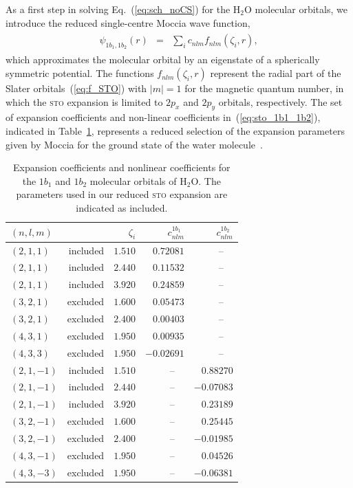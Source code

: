 As a first step in solving Eq.~(\ref{eq:sch_noCS}) for the H$_{2}$O
molecular orbitals, we introduce the reduced single-centre Moccia
wave function,
%
\begin{eqnarray}
  \begin{split}
    \psi_{1b_{1},1b_{2}}(r) & = & \sum\limits_{i} c_{nlm} f_{nlm}(\zeta_{i}, r),
    \label{eq:sto_1b1_1b2}
  \end{split}
\end{eqnarray}
%
which approximates the molecular orbital by an eigenstate of a
spherically symmetric potential. The functions $f_{nlm}(\zeta_{i},r)$
represent the radial part of the Slater orbitals~(\ref{eq:f_STO}) with
$|m|=1$ for the magnetic quantum number, in which the \textsc{sto}
expansion is limited to $2p_{x}$ and $2p_{y}$ orbitals,
respectively. The set of expansion coefficients and non-linear
coefficients in~(\ref{eq:sto_1b1_1b2}), indicated in
Table~\ref{tab:1b11b2_coef}, represents a reduced selection of the
expansion parameters given by Moccia for the ground state of the water
molecule~\cite{Moccia_1964}.

\begin{table}[t]
 \centering
  \caption{\label{tab:1b11b2_coef} Expansion coefficients and
    nonlinear coefficients for the $1b_{1}$ and $1b_{2}$ molecular
    orbitals of H$_{2}$O. The parameters used in our reduced
    \textsc{sto} expansion are indicated as included.}
  \begin{tabular}{lrrrr}
    \toprule
    $(n,l, m)$ & & $\zeta_{i}$ & $c_{nlm}^{1b_{1}}$ & $c_{nlm}^{1b_{2}}$ \\
    \midrule
    $(2,1,1)$ & included & $1.510$ & $0.72081$ & --~~ \\
    $(2,1,1)$ & included & $2.440$ & $0.11532$ & --~~ \\
    $(2,1,1)$ & included & $3.920$ & $0.24859$ & --~~ \\
    $(3,2,1)$ & excluded & $1.600$ & $0.05473$ & --~~ \\
    $(3,2,1)$ & excluded & $2.400$ & $0.00403$ & --~~ \\
    $(4,3,1)$ & excluded & $1.950$ & $0.00935$ & --~~ \\
    $(4,3,3)$ & excluded & $1.950$ & $-0.02691$ & --~~ \\
    $(2,1,-1)$ & included & $1.510$ & --~~ & $0.88270$ \\
    $(2,1,-1)$ & included & $2.440$ & --~~ & $-0.07083$ \\
    $(2,1,-1)$ & included & $3.920$ & --~~ & $0.23189$ \\
    $(3,2,-1)$ & excluded & $1.600$ & --~~ & $0.25445$ \\
    $(3,2,-1)$ & excluded & $2.400$ & --~~ & $-0.01985$ \\
    $(4,3,-1)$ & excluded & $1.950$ & --~~ & $0.04526$ \\
    $(4,3,-3)$ & excluded & $1.950$ & --~~ & $-0.06381$ \\
    \bottomrule
  \end{tabular}
\end{table}

